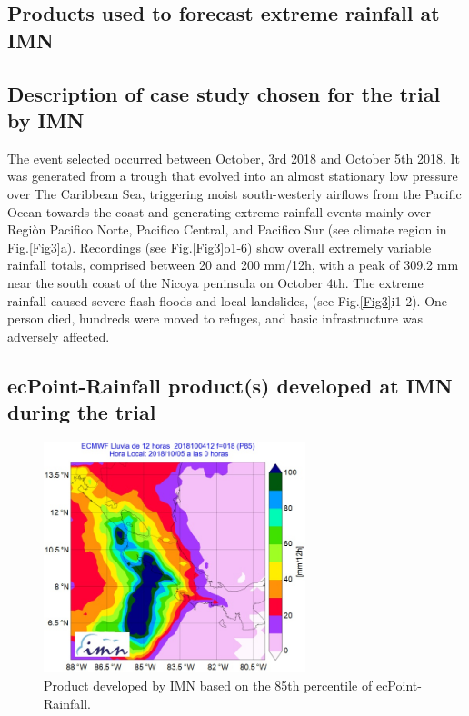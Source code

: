 \documentclass[twocol]{ametsocV5} %
\begin{document}
\subsection{Products used to forecast extreme rainfall at IMN}

\subsection{Description of case study chosen for the trial by IMN}
The event selected occurred between October, 3rd 2018 and October 5th 2018. It was generated from a trough that evolved into an almost stationary low pressure over The Caribbean Sea, triggering moist south-westerly airflows from the Pacific Ocean towards the coast and generating extreme rainfall events mainly over Regiòn Pacifico Norte, Pacifico Central, and Pacifico Sur (see climate region in Fig.\ref{Fig3}a). Recordings (see Fig.\ref{Fig3}o1-6) show overall extremely variable rainfall totals, comprised between 20 and 200 mm/12h, with a peak of 309.2 mm near the south coast of the Nicoya peninsula on October 4th. The extreme rainfall caused severe flash floods and local landslides, (see Fig.\ref{Fig3}i1-2). One person died, hundreds were moved to refuges, and basic infrastructure was adversely affected.


\subsection{ecPoint-Rainfall product(s) developed at IMN during the trial}

\begin{figure}
\centerline{\includegraphics[width=18pc]{manuscript/Figures/Fig5.jpg}}
\caption{Product developed by IMN based on the 85th percentile of ecPoint-Rainfall.}
\label{Fig5}
\end{figure}
\end{document}
